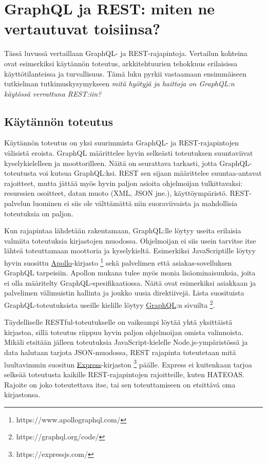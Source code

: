 \chapter{GraphQL ja REST: miten ne vertautuvat toisiinsa?} \label{kolmasluku}

Tässä luvussä vertaillaan GraphQL- ja REST-rajapintoja. Vertailun kohteina ovat esimerkiksi käytännön toteutus, arkkitehtuurien tehokkuus erilaisissa käyttötilanteissa ja turvallisuus. Tämä luku pyrkii vastaamaan ensimmäiseen tutkielman tutkimuskysymykseen \textit{mitä hyötyjä ja haittoja on GraphQL:n käytössä verrattuna REST:iin?}

\setlength{\parindent}{0em}
\setlength{\parskip}{1em}

\section{Käytännön toteutus}

Käytännön toteutus on yksi suurimmista GraphQL- ja REST-rajapintojen välisistä eroista. GraphQL määrittelee hyvin selkeästi toteutuksen suuntaviivat kyselykielelleen ja moottorilleen. Näitä on seurattava tarkasti, jotta GraphQL-toteutusta voi kutsua GraphQL:ksi. REST sen sijaan määrittelee suuntaa-antavat rajoitteet, mutta jättää myös hyvin paljon asioita ohjelmoijan tulkittavaksi: resurssien osoitteet, datan muoto (XML, JSON jne.), käyttöympäristö. REST-palvelun luominen ei siis ole välttämättä niin suoraviivaista ja mahdollisia toteutuksia on paljon. 

Kun rajapintaa lähdetään rakentamaan, GraphQL:lle löytyy useita erilaisia valmiita toteutuksia kirjastojen muodossa. Ohjelmoijan ei siis usein tarvitse itse lähteä toteuttamaan moottoria ja kyselykieltä. Esimerkiksi JavaScriptille löytyy hyvin suosittu \href{https://www.apollographql.com/}{Apollo}-kirjasto \footnote{https://www.apollographql.com/} sekä palvelimen että asiakas-sovelluksen GraphQL tarpeisiin. Apollon mukana tulee myös monia lisäominaisuuksia, joita ei olla määritelty GraphQL-spesifikaatiossa. Näitä ovat esimerkiksi asiakkaan ja palvelimen välimuistin hallinta ja joukko uusia direktiivejä. Lista suosituista GraphQL-toteutuksista useille kielille löytyy \href{https://graphql.org/code/}{GraphQL}:n sivuilta \footnote{https://graphql.org/code/}. \cite{apollo-docs, graphqlorg}

Täydelliselle RESTful-toteutukselle on vaikeampi löytää yhtä yksittäistä kirjastoa, sillä toteutus riippuu hyvin paljon ohjelmoijan omista valinnoista. Mikäli etsitään jälleen toteutuksia JavaScript-kielelle Node.js-ympäristössä ja data halutaan tarjota JSON-muodossa, REST rajapinta toteutetaan mitä luultavimmin suositun \href{https://expressjs.com/}{Express}-kirjaston \footnote{https://expressjs.com/} päälle. Express ei kuitenkaan tarjoa selkeää toteutusta kaikille REST-rajapintojen rajoitteille, kuten HATEOAS. Rajoite on joko toteutettava itse, tai sen toteuttamiseen on etsittävä oma kirjastonsa. \cite{express}

